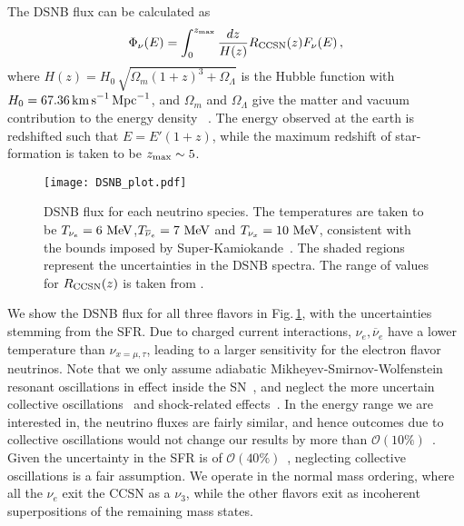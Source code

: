 \documentclass[prd,aps,twocolumn,tightenlines,notitlepage,nofootinbib,preprintnumbers,letterpaper,superscriptaddress]{revtex4-2}
\def \R  {R_{\rm CCSN}}
\newcommand{\MeV}{{\rm\ MeV}}
\begin{document}
The DSNB flux can be calculated as~\cite{Horiuchi:2008jz,Beacom:2010kk}
\begin{equation}\label{eq:DSNB}
\Phi_{\nu}(E)=\int_0^{z_{\rm max}}\frac{dz}{H(z)}\R(z) F_\nu(E)\,,
\end{equation}
where $H(z) = H_0\, \sqrt{\Omega_m (1+z)^3+\Omega_\Lambda}$ is the Hubble function with $H_0=67.36\,{\rm km\,s}^{-1}\,{\rm Mpc}^{-1}$, and $\Omega_m$ and $\Omega_\Lambda$ give the matter and vacuum contribution to the energy density ~\cite{Aghanim:2018eyx}. The energy observed at the earth is redshifted such that $E=E'(1+z)$, while the maximum redshift of star-formation is taken to be $z_{\rm max}\sim 5$.

\begin{figure}[!t]
    \centering
    \texttt{[image: DSNB\_plot.pdf]}
    \caption{DSNB flux for each neutrino species. The temperatures are taken to be $T_{\nu_e}=6\MeV$,$T_{\overline{\nu}_e}=7\MeV$ and $T_{\nu_x}=10\MeV$, consistent with the bounds imposed by Super-Kamiokande~\cite{Zhang:2013tua}. The shaded regions represent the uncertainties in the DSNB spectra. The range of values for $\R(z)$ is taken from \cite{Horiuchi:2008jz}.}
    \label{fig:DSNB}
\end{figure}

We show the DSNB flux for all three flavors in Fig.\,\ref{fig:DSNB}, with the uncertainties stemming from the SFR. Due to charged current interactions, $\nu_e,\overline{\nu}_e$ have a lower temperature than $\nu_{x=\mu,\tau}$, leading to a larger sensitivity for the electron flavor neutrinos. Note that we only assume adiabatic Mikheyev-Smirnov-Wolfenstein resonant oscillations in effect inside the SN~\cite{PhysRevD.17.2369,Mikheev:1986gs}, and neglect the more uncertain collective oscillations~\cite{Duan:2006an,Hannestad:2006nj} and shock-related effects~\cite{Dasgupta:2005wn}. In the energy range we are interested in, the neutrino fluxes are fairly similar, and hence outcomes due to collective oscillations would not change our results by more than $\mathcal{O}(10\%)$~\cite{Lunardini:2010ab}. Given the uncertainty in the SFR is of $\mathcal{O}(40\%)$~\cite{Horiuchi:2008jz}, neglecting collective oscillations is a fair assumption. We operate in the normal mass ordering, where all the $\nu_e$ exit the CCSN as a $\nu_3$, while the other flavors exit as incoherent superpositions of the remaining mass states.
\end{document}

